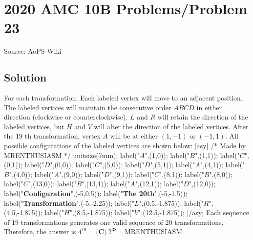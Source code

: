 \documentclass[12pt]{article}
\begin{document}
\section*{{2020 AMC 10B Problems/Problem 23}}
Source: AoPS Wiki

\subsection*{Solution}
For each transformation: Each labeled vertex will move to an adjacent position. The labeled vertices will maintain the consecutive order $ABCD$ in either direction (clockwise or counterclockwise). $L$ and $R$ will retain the direction of the labeled vertices, but $H$ and $V$ will alter the direction of the labeled vertices. After the $19$ th transformation, vertex $A$ will be at either $(1,-1)$ or $(-1,1).$ All possible configurations of the labeled vertices are shown below: [asy] /* Made by MRENTHUSIASM */ unitsize(7mm); label("$A$",(1,0)); label("$B$",(1,1)); label("$C$",(0,1)); label("$D$",(0,0)); label("$C$",(5,0)); label("$D$",(5,1)); label("$A$",(4,1)); label("$B$",(4,0)); label("$A$",(9,0)); label("$D$",(9,1)); label("$C$",(8,1)); label("$B$",(8,0)); label("$C$",(13,0)); label("$B$",(13,1)); label("$A$",(12,1)); label("$D$",(12,0)); label("\textbf{Configuration}",(-5,0.5)); label("\textbf{The 20th}",(-5,-1.5)); label("\textbf{Transformation}",(-5,-2.25)); label("$L$",(0.5,-1.875)); label("$R$",(4.5,-1.875)); label("$H$",(8.5,-1.875)); label("$V$",(12.5,-1.875)); [/asy] Each sequence of $19$ transformations generates one valid sequence of $20$ transformations. Therefore, the answer is $4^{19}=\boxed{\textbf{(C)}\ 2^{38}}.$ ~MRENTHUSIASM
\end{document}
